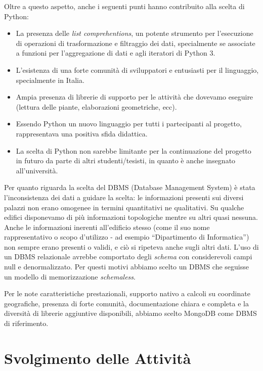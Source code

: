 \documentclass[12pt]{report}
\begin{document}
Oltre a questo aspetto, anche i seguenti punti hanno contribuito alla scelta di Python:
\begin{itemize}
  \item La presenza delle \textit{list comprehentions}, un potente strumento per l'esecuzione di operazioni di trasformazione e filtraggio dei dati, specialmente se associate a funzioni per l'aggregazione di dati e agli iteratori di Python 3.
  \item L'esistenza di una forte comunità di sviluppatori e entusiasti per il linguaggio, specialmente in Italia.
  \item Ampia presenza di librerie di supporto per le attività che dovevamo eseguire (lettura delle piante, elaborazioni geometriche, ecc).
  \item Essendo Python un nuovo linguaggio per tutti i partecipanti al progetto, rappresentava una positiva sfida didattica.
  \item La scelta di Python non sarebbe limitante per la continuazione del progetto in futuro da parte di altri studenti/tesisti, in quanto è anche insegnato all'università.
\end{itemize}

Per quanto riguarda la scelta del DBMS (Database Management System) è stata l'inconsistenza dei dati a guidare la scelta: le informazioni presenti sui diversi palazzi non erano omogenee in termini quantitativi ne qualitativi. Su qualche edifici disponevamo di più informazioni topologiche mentre su altri quasi nessuna. Anche le informazioni inerenti all'edificio stesso (come il suo nome rappresentativo o scopo d'utilizzo - ad esempio ``Dipartimento di Informatica'') non sempre erano presenti o validi, e ciò si ripeteva anche sugli altri dati. L'uso di un DBMS relazionale avrebbe comportato degli \textit{schema} con considerevoli campi null e denormalizzato. Per questi motivi abbiamo scelto un DBMS che seguisse un modello di memorizzazione \textit{schemaless}. 

Per le note caratteristiche prestazionali, supporto nativo a calcoli su coordinate geografiche, presenza di forte comunità, documentazione chiara e completa e la diversità di librerie aggiuntive disponibili, abbiamo scelto MongoDB come DBMS di riferimento.


% 
% 
\chapter{Svolgimento delle Attività}
\label{cap3}
\end{document}

